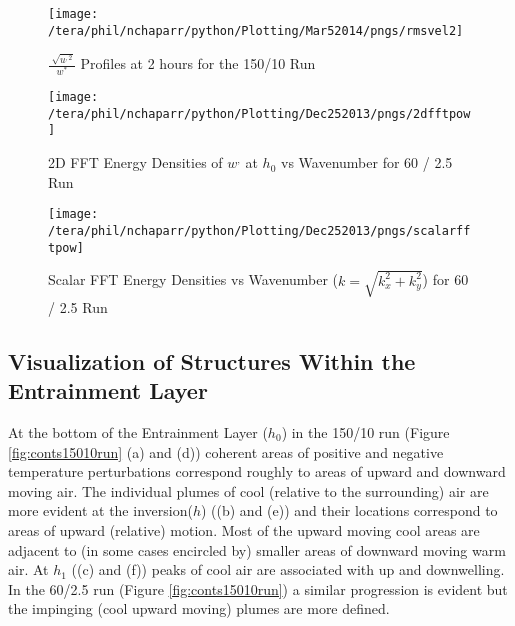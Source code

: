 \begin{figure}[htbp]
    \centering
    \texttt{[image: /tera/phil/nchaparr/python/Plotting/Mar52014/pngs/rmsvel2]}
    \caption{$\frac{\sqrt[]{u^{,2}}}{w^{*}}$ Profiles at 2 hours for the 150/10 Run}
    \label{fig:rmsvel150102hrs}   %
\end{figure}

\begin{figure}[htbp]
    \centering
    \texttt{[image: /tera/phil/nchaparr/python/Plotting/Dec252013/pngs/2dfftpow]}
    \caption{2D FFT Energy Densities of $w^{,}$ at $h_{0}$ vs Wavenumber for 60 / 2.5 Run}
    \label{fig:scalardfftw602point5}   %
\end{figure}

\begin{figure}[htbp]
    \centering
    \texttt{[image: /tera/phil/nchaparr/python/Plotting/Dec252013/pngs/scalarfftpow]}
    \caption{Scalar FFT  Energy Densities vs Wavenumber ($k = \sqrt{k_{x}^{2}+k_{y}^{2}}$) for 60 / 2.5 Run}
    \label{fig:2fftw602point5}   %
\end{figure}

\subsection{Visualization of Structures Within the Entrainment Layer}

At the bottom of the Entrainment Layer ($h_{0}$) in the 150/10 run (Figure \ref{fig:conts15010run} (a) and (d)) coherent
areas of positive and negative temperature perturbations correspond roughly to areas of upward and downward 
moving air.  The individual plumes of cool (relative to the surrounding) air are more evident at the inversion($h$)
((b) and (e)) and their locations correspond to areas of upward (relative) motion.  Most of the upward moving
 cool areas are adjacent to (in some cases encircled by) smaller areas of downward moving warm air. At $h_{1}$ ((c) and (f)) peaks of cool
air are associated with up and downwelling.\\  

In the 60/2.5 run (Figure \ref{fig:conts15010run}) a similar progression is evident but the impinging (cool upward moving)
plumes are more defined.\\   

